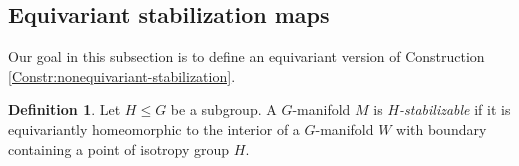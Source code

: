 \documentclass[11pt]{amsart}
\makeatletter
\theoremstyle{definition}
\newtheorem{definition}[equation]{Definition}
\numberwithin{equation}{subsection} %
\newcommand{\Conf}{\operatorname{Conf}}
\newcommand{\switchmargin}{
\if@reversemargin
\normalmarginpar
\else
\reversemarginpar
\fi
}
\newcommand{\ChaseNote}[1]
   {\marginpar{\raggedright\smaller \smaller \color{purple}#1}\switchmargin}
\newcommand{\nv}{^{-1}}
\makeatother
\begin{document}





\subsection{Equivariant stabilization maps}\label{SS:GConf}
Our goal in this subsection is to define an equivariant version of Construction
\ref{Constr:nonequivariant-stabilization}.

\begin{definition}\label{Def:HStab}
Let $H \leq G$ be a subgroup. A $G$-manifold $M$ is \emph{$H$-stabilizable} if
it is equivariantly homeomorphic to the interior of a $G$-manifold $W$ with boundary containing a point of isotropy group $H$. 
\end{definition}
\end{document}
